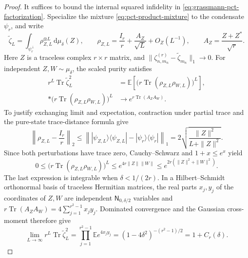 \documentclass[11pt]{article}
\theoremstyle{remark}
\theoremstyle{plain}
\newcommand{\dd}{\mathrm d}
\newcommand{\Tr}{\operatorname{Tr}}
\newcommand{\proj}[1]{|#1\rangle\!\langle #1|}
\newcommand{\ot}{\otimes}
\begin{document}
\begin{proof}
It suffices to bound the internal squared infidelity in
\eqref{eq:grassmann-pct-factorization}.  Specialize the mixture
\eqref{eq:pct-product-mixture} to the condensate \(\psi_r\), and write
\[
  \widetilde\zeta_L
  =\int_{\psi_r^\perp}\rho_{Z,L}^{\ot L}\,\dd\mu_\delta(Z),
  \qquad
  \rho_{Z,L}=\frac{I_r}{r}+\frac{A_Z}{\sqrt L}+O_Z(L^{-1}),
  \qquad A_Z=\frac{Z+Z^*}{\sqrt r}.
\]
Here \(Z\) is a traceless complex \(r\times r\) matrix, and
\(\|\zeta_{n,m_n}^{(r)}-\widetilde\zeta_{m_n}\|_1\to0\).
For independent \(Z,W\sim\mu_\delta\), the scaled purity satisfies
\begin{align*}
  r^L\Tr\widetilde\zeta_L^2
  &=\mathbb E\!\left[
      \bigl(r\Tr(\rho_{Z,L}\rho_{W,L})\bigr)^L
    \right],\\*
  \bigl(r\Tr(\rho_{Z,L}\rho_{W,L})\bigr)^L
  &\longrightarrow e^{r\Tr(A_ZA_W)}.
\end{align*}
To justify exchanging limit and expectation, contraction under partial
trace and the pure-state trace-distance formula give
\[
  \left\|\rho_{Z,L}-\frac{I_r}{r}\right\|_2
  \le
  \left\|\proj{\psi_{Z,L}}-\proj{\psi_r}\right\|_1
  =2\sqrt{\frac{\|Z\|^2}{L+\|Z\|^2}}.
\]
Since both perturbations have trace zero, Cauchy--Schwarz and
\(1+x\le e^x\) yield
\[
  0\le\bigl(r\Tr(\rho_{Z,L}\rho_{W,L})\bigr)^L
  \le e^{4r\|Z\|\|W\|}
  \le e^{2r(\|Z\|^2+\|W\|^2)}.
\]
The last expression is integrable when \(\delta<1/(2r)\).
In a Hilbert--Schmidt orthonormal basis of traceless Hermitian matrices,
the real parts \(x_j,y_j\) of the coordinates of \(Z,W\) are independent
\(\mathsf N_{0,\delta/2}\) variables and
\(r\Tr(A_ZA_W)=4\sum_{j=1}^{r^2-1}x_jy_j\).
Dominated convergence and the Gaussian cross-moment therefore give
\begin{equation}\label{eq:pct-internal-purity-limit}
  \lim_{L\to\infty}r^L\Tr\widetilde\zeta_L^2
  =\prod_{j=1}^{r^2-1}\mathbb E e^{4x_jy_j}
  =(1-4\delta^2)^{-(r^2-1)/2}
  =1+C_r(\delta).
\end{equation}


\end{proof}
\end{document}
